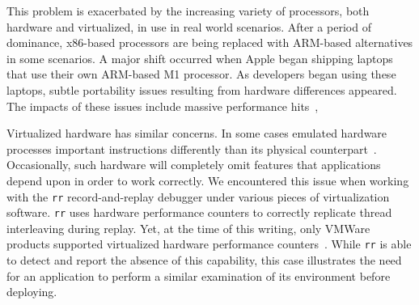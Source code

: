This problem is exacerbated by the increasing variety of processors, both hardware and virtualized, in use in real world scenarios.
After a period of dominance,
x86-based processors are being replaced with ARM-based alternatives in some scenarios.
A major shift occurred when Apple began shipping laptops that use their own ARM-based M1 processor.
As developers began using these laptops,
subtle portability issues resulting from hardware differences appeared.
The impacts of these issues include massive performance hits~\cite{ghcompile}, 

Virtualized hardware has similar concerns.
In some cases emulated hardware processes important instructions differently than its physical counterpart~\cite{unicornbug}.
Occasionally,
such hardware will completely omit features that applications depend upon in order to work correctly.
We encountered this issue when working with the {\tt rr}
record-and-replay debugger under various pieces of virtualization software.
{\tt rr} uses hardware performance counters to correctly replicate thread interleaving during replay. Yet,
at the time of this writing,
only VMWare products supported virtualized hardware performance counters~\cite{vmwarecounters}.
While {\tt rr} is able to detect and report the absence of this capability,
this case illustrates the need for an application to perform a similar examination of its environment before deploying.




